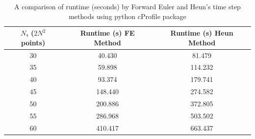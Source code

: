 \begin{table}[h!]
	\begin{tabular}{|c|c|c|} 
		\hline 
		$N$, ($2N^2$ points) & Runtime (s) FE Method & Runtime (s) Heun Method \\ 
		\hline 
		30 & 40.430 & 81.479 \\ 
		\hline 
		35 & 59.898 & 114.232 \\ 
		\hline 
		40 & 93.374 & 179.741 \\ 
		\hline 
		45 & 148.440 & 274.582 \\ 
		\hline 
		50 & 200.886 & 372.805 \\ 
		\hline 
		55 & 286.968 & 503.502 \\ 
		\hline 
		60 & 410.417 & 663.437 \\ 
		\hline
	\end{tabular}
\caption[Comparison of Runtime by Forward Euler and Heun's time step methods]{A comparison of runtime (seconds) by Forward Euler and Heun's time step methods using python cProfile package}
\label{table: runtime}
\end{table}

